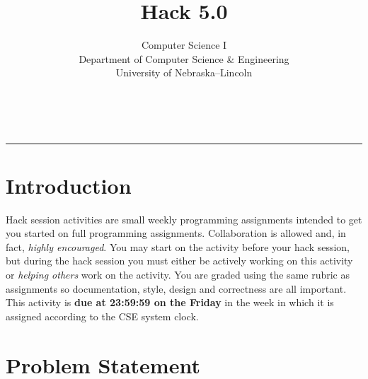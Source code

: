 \documentclass[12pt]{scrartcl}
\title{Hack 5.0}\let\Title\@title
\subtitle{Computer Science I\\
{\small
\vskip1cm
Department of Computer Science \& Engineering \\
University of Nebraska--Lincoln}
\vskip-1cm}
\date{~}
\begin{document}
\maketitle

\hrule

\section*{Introduction}

Hack session activities are small weekly programming assignments intended
to get you started on full programming assignments.  Collaboration is allowed
and, in fact, \emph{highly encouraged}.  You may start on the activity before
your hack session, but during the hack session you must either be actively 
working on this activity or \emph{helping others} work on the activity.
You are graded using the same rubric as assignments so documentation, style, 
design and correctness are all important.  This activity is \textbf{due 
at 23:59:59 on the Friday} in the week in which it is assigned according 
to the CSE system clock.


\section*{Problem Statement}
\end{document}

